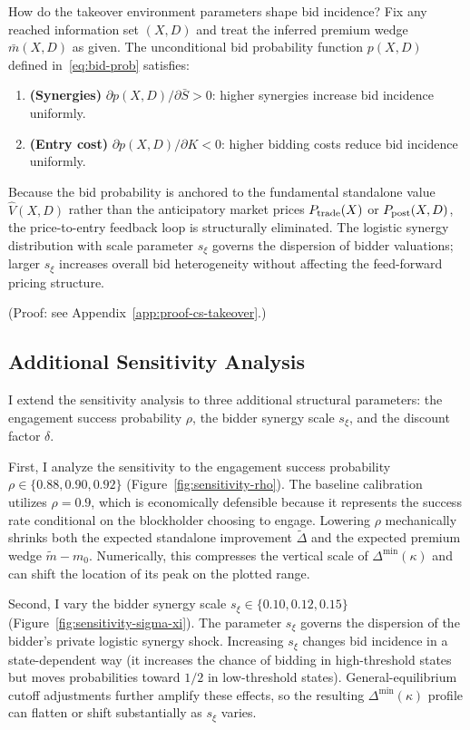 \documentclass[11pt]{article}
\newcommand{\1}{\mathbf{1}}
\begin{document}
How do the takeover environment parameters shape bid incidence? Fix any reached information set $(X,D)$ and treat the inferred premium wedge $\bar{m}(X,D)$ as given. The unconditional bid probability function $p(X,D)$ defined in~\eqref{eq:bid-prob} satisfies:
\begin{enumerate}[label=\textup{(\alph*)},leftmargin=2em]
\item \textbf{(Synergies)} $\partial p(X,D) / \partial \bar{S} > 0$: higher synergies increase bid incidence uniformly.
\item \textbf{(Entry cost)} $\partial p(X,D) / \partial K < 0$: higher bidding costs reduce bid incidence uniformly.
\end{enumerate}
Because the bid probability is anchored to the fundamental standalone value $\hat{V}(X,D)$ rather than the anticipatory market prices $P_{\textup{trade}}(X)$ or $P_{\textup{post}}(X,D)$, the price-to-entry feedback loop is structurally eliminated. The logistic synergy distribution with scale parameter $s_\xi$ governs the dispersion of bidder valuations; larger $s_\xi$ increases overall bid heterogeneity without affecting the feed-forward pricing structure.

(Proof: see Appendix~\ref{app:proof-cs-takeover}.)

%
\subsection{Additional Sensitivity Analysis}
%

I extend the sensitivity analysis to three additional structural parameters: the engagement success probability $\rho$, the bidder synergy scale $s_\xi$, and the discount factor $\delta$.

First, I analyze the sensitivity to the engagement success probability $\rho \in \{0.88, 0.90, 0.92\}$ (Figure~\ref{fig:sensitivity-rho}). The baseline calibration utilizes $\rho = 0.9$, which is economically defensible because it represents the success rate conditional on the blockholder choosing to engage. Lowering $\rho$ mechanically shrinks both the expected standalone improvement $\tilde{\Delta}$ and the expected premium wedge $\tilde{m}-m_0$. Numerically, this compresses the vertical scale of $\Delta^{\min}(\kappa)$ and can shift the location of its peak on the plotted range.

Second, I vary the bidder synergy scale $s_\xi \in \{0.10, 0.12, 0.15\}$ (Figure~\ref{fig:sensitivity-sigma-xi}). The parameter $s_\xi$ governs the dispersion of the bidder's private logistic synergy shock. Increasing $s_\xi$ changes bid incidence in a state-dependent way (it increases the chance of bidding in high-threshold states but moves probabilities toward $1/2$ in low-threshold states). General-equilibrium cutoff adjustments further amplify these effects, so the resulting $\Delta^{\min}(\kappa)$ profile can flatten or shift substantially as $s_\xi$ varies.
\end{document}
